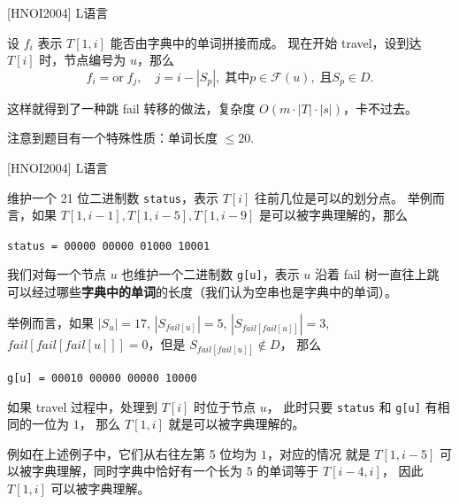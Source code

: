 \documentclass{beamer}
\begin{document}
\begin{frame}[fragile]{[HNOI2004] L语言}
    \footnotesize

    设 $f_i$ 表示 $T[1,i]$ 能否由字典中的单词拼接而成。\pause 
    现在开始 travel，设到达 $T[i]$ 时，节点编号为 $u$，那么
    \begin{equation*}
        f_i=\text{or}\; f_j,\quad j=i-|S_p|,\; \text{其中} p\in \mathcal{F}(u),\; \text{且} S_p\in D.
    \end{equation*}

    这样就得到了一种跳 fail 转移的做法，复杂度 $O(m \cdot |T| \cdot |s|)$，卡不过去。

    \vspace{1em}\pause
    注意到题目有一个特殊性质：单词长度 $\leq 20$.
\end{frame}

\begin{frame}[fragile]{[HNOI2004] L语言}
    \footnotesize

    维护一个 21 位二进制数 \verb|status|，表示 $T[i]$ 往前几位是可以的划分点。
    举例而言，如果 $T[1,i-1],T[1,i-5],T[1,i-9]$ 是可以被字典理解的，那么
    
    \verb|status = 00000 00000 01000 10001|

    \vspace{1em}\pause
    我们对每一个节点 $u$ 也维护一个二进制数 \verb|g[u]|，表示 $u$ 沿着 fail 树一直往上跳
    可以经过哪些\textbf{字典中的单词}的长度（我们认为空串也是字典中的单词）。

    \vspace{1em}
    举例而言，如果 $|S_u|=17$, $|S_{fail[u]}|=5$, $|S_{fail[fail[u]]}|=3$, 
    $fail[fail[fail[u]]]=0$，但是 $S_{fail[fail[u]]}\notin D$，
    那么

    \verb|g[u] = 00010 00000 00000 10000|

    \vspace{1em}\pause
    如果 travel 过程中，处理到 $T[i]$ 时位于节点 $u$，
    此时只要 \verb|status| 和 \verb|g[u]| 有相同的一位为 $1$，
    那么 $T[1,i]$ 就是可以被字典理解的。

    \vspace{1em}\pause
    例如在上述例子中，它们从右往左第 5 位均为 $1$，对应的情况
    就是 $T[1,i-5]$ 可以被字典理解，同时字典中恰好有一个长为 $5$ 的单词等于 $T[i-4,i]$，
    因此 $T[1,i]$ 可以被字典理解。
\end{frame}
\end{document}
